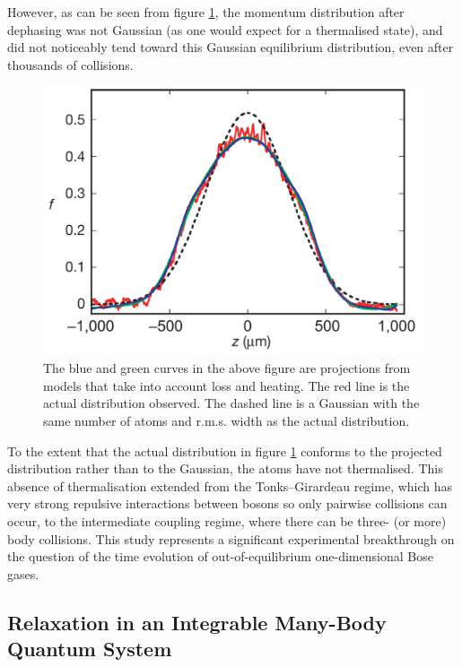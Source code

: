 \documentclass[a4paper, 10pt]{article}
\theoremstyle{plain}
\begin{document}
However, as can be seen from figure \ref{fig:dephased_momentum_distribution}, 
the momentum distribution after dephasing was not Gaussian (as one
would expect for a thermalised state), and did not noticeably
tend toward this Gaussian equilibrium distribution, even after thousands of 
collisions.
\begin{figure}[H]
    \begin{center}
    \includegraphics[width=1.0\textwidth]{dephased_momentum_distribution}
    \end{center}
    \caption{\label{fig:dephased_momentum_distribution}
             The blue and green curves in the above figure are projections from
             models that take into account loss and heating. The red line is the
             actual distribution observed. The dashed line is a Gaussian with
             the same number of atoms and r.m.s. width as the actual
             distribution.}
\end{figure}
To the extent that the actual distribution in figure
\ref{fig:dephased_momentum_distribution} conforms to the projected distribution
rather than to the Gaussian, the atoms have not thermalised. This absence of 
thermalisation extended from the Tonks--Girardeau regime, which has very
strong repulsive interactions between bosons so only pairwise collisions can
occur, to the intermediate coupling regime, where there can be three-
(or more) body collisions. This study represents a significant experimental 
breakthrough on the question of the time evolution of out-of-equilibrium 
one-dimensional Bose gases.

\subsection{Relaxation in an Integrable Many-Body Quantum System}
\end{document}
